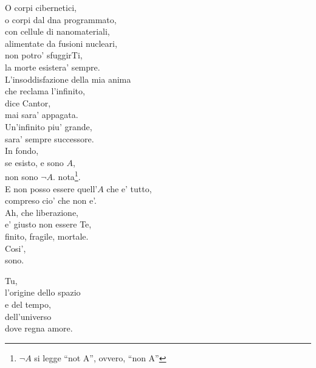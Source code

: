 \begin{haiku}
    O corpi cibernetici,\\
    o corpi dal dna programmato,\\
    con cellule di nanomateriali,\\
    alimentate da fusioni nucleari,\\
    non potro' sfuggirTi,\\
    la morte esistera' sempre.\\
    L'insoddisfazione della mia anima\\
    che reclama l'infinito,\\
    dice Cantor,\\
    mai sara' appagata.\\
    Un'infinito piu' grande,\\
    sara' sempre successore.\\
    In fondo,\\
    se esisto, e sono $A$,\\
    non sono $\lnot A$. \hspace{2cm} {\footnotesize nota}\footnote{$\lnot A$ si legge ``not A'', ovvero, ``non A''}.\\
    E non posso essere quell'$A$ che e' tutto, \\
    compreso cio' che non e'.\\
    Ah, che liberazione,\\
    e' giusto non essere Te,\\
    finito, fragile, mortale.\\
    Cosi',\\
    sono.\\
\end{haiku}

\centerpoemon{}
\begin{haiku}
    Tu,\\
    l'origine dello spazio \\
    e del tempo,\\
    dell'universo\\
    dove regna amore.\\
\end{haiku}
